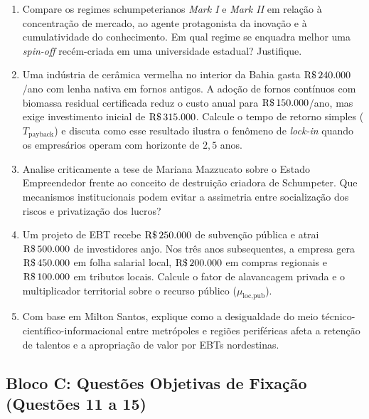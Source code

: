 \begin{enumerate}[leftmargin=1.6em, itemsep=6pt, resume]
  \item Compare os regimes schumpeterianos \textit{Mark I} e \textit{Mark II} em relação à concentração de mercado, ao agente protagonista da inovação e à cumulatividade do conhecimento. Em qual regime se enquadra melhor uma \textit{spin-off} recém-criada em uma universidade estadual? Justifique.
  \espacoResolucao[2.0cm]

  \item Uma indústria de cerâmica vermelha no interior da Bahia gasta $\text{R\$\,}{240.000}$/ano com lenha nativa em fornos antigos. A adoção de fornos contínuos com biomassa residual certificada reduz o custo anual para $\text{R\$\,}{150.000}$/ano, mas exige investimento inicial de $\text{R\$\,}{315.000}$. Calcule o tempo de retorno simples ($T_{\text{payback}}$) e discuta como esse resultado ilustra o fenômeno de \textit{lock-in} quando os empresários operam com horizonte de $2{,}5$ anos.
  \espacoResolucao[2.2cm]

  \item Analise criticamente a tese de Mariana Mazzucato sobre o Estado Empreendedor frente ao conceito de destruição criadora de Schumpeter. Que mecanismos institucionais podem evitar a assimetria entre socialização dos riscos e privatização dos lucros?
  \espacoResolucao[2.0cm]

  \item Um projeto de EBT recebe $\text{R\$\,}{250.000}$ de subvenção pública e atrai $\text{R\$\,}{500.000}$ de investidores anjo. Nos três anos subsequentes, a empresa gera $\text{R\$\,}{450.000}$ em folha salarial local, $\text{R\$\,}{200.000}$ em compras regionais e $\text{R\$\,}{100.000}$ em tributos locais. Calcule o fator de alavancagem privada e o multiplicador territorial sobre o recurso público ($\mu_{\text{loc,pub}}$).
  \espacoResolucao[2.2cm]

  \item Com base em Milton Santos, explique como a desigualdade do meio técnico-científico-informacional entre metrópoles e regiões periféricas afeta a retenção de talentos e a apropriação de valor por EBTs nordestinas.
  \espacoResolucao[2.0cm]
\end{enumerate}

\subsection*{Bloco C: Questões Objetivas de Fixação (Questões 11 a 15)}


